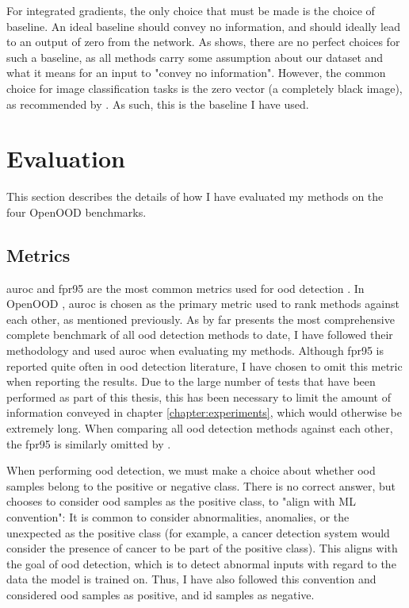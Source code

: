 \documentclass[UKenglish]{uiomasterthesis} %
\theoremstyle{definition}
\begin{document}
For integrated gradients, the only choice that must be made is the choice of baseline. An ideal baseline should convey no information, and should ideally lead to an output of zero from the network. As \cite{sturmfels2020visualizing} shows, there are no perfect choices for such a baseline, as all methods carry some assumption about our dataset and what it means for an input to "convey no information". However, the common choice for image classification tasks is the zero vector (a completely black image), as recommended by \cite{integratedgradients}. As such, this is the baseline I have used.

\section{Evaluation}

This section describes the details of how I have evaluated my methods on the four OpenOOD benchmarks.


\subsection{Metrics}

\ac{auroc} and \ac{fpr95} are the most common metrics used for \ac{ood} detection \cite{oodbaseline, odin, oodoverview, openood, vim}. In OpenOOD \cite{openood}, \ac{auroc} is chosen as the primary metric used to rank methods against each other, as mentioned previously. As \cite{openood} by far presents the most comprehensive complete benchmark of all \ac{ood} detection methods to date, I have followed their methodology and used \ac{auroc} when evaluating my methods. Although \ac{fpr95} is reported quite often in \ac{ood} detection literature, I have chosen to omit this metric when reporting the results. Due to the large number of tests that have been performed as part of this thesis, this has been necessary to limit the amount of information conveyed in chapter \ref{chapter:experiments}, which would otherwise be extremely long. When comparing all \ac{ood} detection methods against each other, the \ac{fpr95} is similarly omitted by \cite{openood15}. %

When performing \ac{ood} detection, we must make a choice about whether \ac{ood} samples belong to the positive or negative class. There is no correct answer, but \cite{openood} chooses to consider \ac{ood} samples as the positive class, to "align with ML convention": It is common to consider abnormalities, anomalies, or the unexpected as the positive class (for example, a cancer detection system would consider the presence of cancer to be part of the positive class). This aligns with the goal of \ac{ood} detection, which is to detect abnormal inputs with regard to the data the model is trained on. Thus, I have also followed this convention and considered \ac{ood} samples as positive, and \ac{id} samples as negative.
\end{document}
